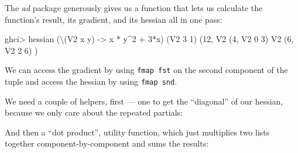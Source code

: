 \documentclass[]{article}
\newenvironment{Shaded}{}{}
\newcommand{\CommentTok}[1]{\textcolor[rgb]{0.38,0.63,0.69}{\textit{#1}}}
\newcommand{\DataTypeTok}[1]{\textcolor[rgb]{0.56,0.13,0.00}{#1}}
\newcommand{\DecValTok}[1]{\textcolor[rgb]{0.25,0.63,0.44}{#1}}
\newcommand{\FunctionTok}[1]{\textcolor[rgb]{0.02,0.16,0.49}{#1}}
\newcommand{\KeywordTok}[1]{\textcolor[rgb]{0.00,0.44,0.13}{\textbf{#1}}}
\newcommand{\NormalTok}[1]{#1}
\newcommand{\OperatorTok}[1]{\textcolor[rgb]{0.40,0.40,0.40}{#1}}
\newcommand{\OtherTok}[1]{\textcolor[rgb]{0.00,0.44,0.13}{#1}}
\begin{document}
The \emph{ad} package generously gives us a function that lets us calculate the
function's result, its gradient, and its hessian all in one pass:

\begin{Shaded}
\begin{Highlighting}[]
\NormalTok{ghci}\OperatorTok{\textgreater{}}\NormalTok{ hessian\textquotesingle{} (\textbackslash{}(}\DataTypeTok{V2}\NormalTok{ x y) }\OtherTok{{-}\textgreater{}}\NormalTok{ x }\OperatorTok{*}\NormalTok{ y}\OperatorTok{\^{}}\DecValTok{2} \OperatorTok{+} \DecValTok{3}\OperatorTok{*}\NormalTok{x) (}\DataTypeTok{V2} \DecValTok{3} \DecValTok{1}\NormalTok{)}
\NormalTok{(}\DecValTok{12}\NormalTok{, }\DataTypeTok{V2}\NormalTok{ (}\DecValTok{4}\NormalTok{, }\DataTypeTok{V2} \DecValTok{0} \DecValTok{3}\NormalTok{)}
     \DataTypeTok{V2}\NormalTok{ (}\DecValTok{6}\NormalTok{, }\DataTypeTok{V2} \DecValTok{2} \DecValTok{6}\NormalTok{)}
\NormalTok{)}
\end{Highlighting}
\end{Shaded}

We can access the gradient by using \texttt{fmap\ fst} on the second component
of the tuple and access the hessian by using \texttt{fmap\ snd}.

We need a couple of helpers, first --- one to get the ``diagonal'' of our
hessian, because we only care about the repeated partials:

\begin{Shaded}
\end{Shaded}

And then a ``dot product'', utility function, which just multiplies two lists
together component-by-component and sums the results:
\end{document}
